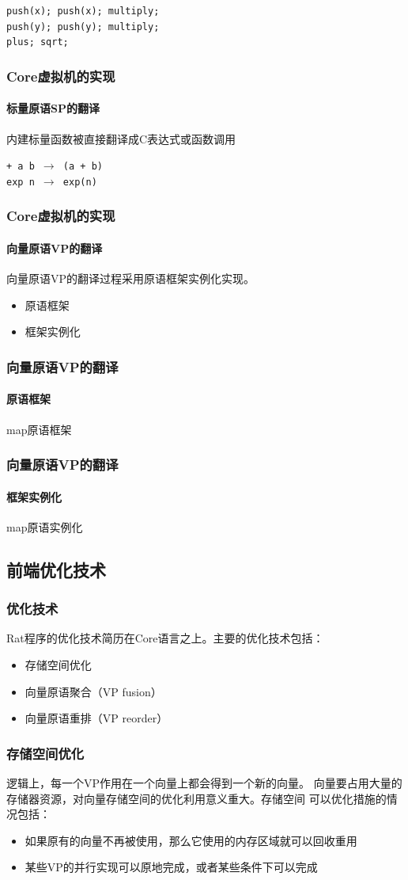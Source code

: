 \documentclass{beamer}
\begin{document}
\begin{frame}[t]
{    \texttt{push(x); push(x); multiply;\\push(y); push(y); multiply;\\plus; sqrt;}
  }
\end{frame}

\begin{frame}
  \frametitle{Core虚拟机的实现}
  \framesubtitle{标量原语SP的翻译}
  内建标量函数被直接翻译成C表达式或函数调用

  \texttt{+ a b $\rightarrow$  (a + b)}\\
  \texttt{exp n $\rightarrow$ exp(n)}
\end{frame}

\begin{frame}
  \frametitle{Core虚拟机的实现}
  \framesubtitle{向量原语VP的翻译}
  向量原语VP的翻译过程采用原语框架实例化实现。
  \begin{itemize}
    \item 原语框架
    \item 框架实例化
  \end{itemize}
\end{frame}

\begin{frame}
  \frametitle{向量原语VP的翻译}
  \framesubtitle{原语框架}
  map原语框架
  
\end{frame}

\begin{frame}
  \frametitle{向量原语VP的翻译}
  \framesubtitle{框架实例化}
  map原语实例化
  
\end{frame}

\subsection{前端优化技术}
\begin{frame}
  \frametitle{优化技术}
  Rat程序的优化技术简历在Core语言之上。主要的优化技术包括：
  \begin{itemize}
    \item 存储空间优化
    \item 向量原语聚合（VP fusion）
    \item 向量原语重排（VP reorder）
  \end{itemize}
\end{frame}

\begin{frame}
  \frametitle{存储空间优化}
  逻辑上，每一个VP作用在一个向量上都会得到一个新的向量。
  向量要占用大量的存储器资源，对向量存储空间的优化利用意义重大。存储空间
  可以优化措施的情况包括：
  \pause
  \begin{itemize}
    \item 如果原有的向量不再被使用，那么它使用的内存区域就可以回收重用
    \item 某些VP的并行实现可以原地完成，或者某些条件下可以完成
  \end{itemize}
\end{frame}
\end{document}
